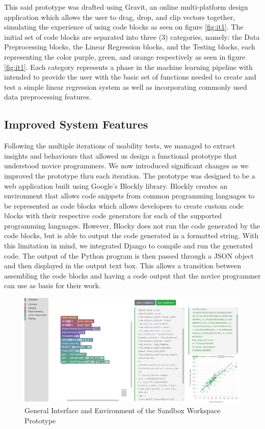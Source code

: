 \documentclass{sigchi}
\begin{document}
This said prototype was drafted using Gravit, an online multi-platform design application which allows the user to drag, drop, and clip vectors together, simulating the experience of using code blocks as seen on figure \ref{fig:it1}. The initial set of code blocks are separated into three (3) categories, namely: the Data Preprocessing blocks, the Linear Regression blocks, and the Testing blocks, each representing the color purple, green, and orange respectively as seen in figure \ref{fig:it1}. Each category represents a phase in the machine learning pipeline with intended to provide the user with the basic set of functions needed to create and test a simple linear regression system as well as incorporating commonly used data preprocessing features.

\subsection{Improved System Features}
Following the multiple iterations of usability tests, we managed to extract insights and behaviours that allowed us design a functional prototype that understood novice programmers. 
We now introduced significant changes as we improved the prototype thru each iteration. The prototype was designed to be a web application built using Google's Blockly library. Blockly creates an environment that allows code snippets from common programming languages to be represented as code blocks which allows developers to create custom code blocks with their respective code generators for each of the supported programming languages. However, Blocky does not run the code generated by the code blocks, but is able to output the code generated in a formatted string. With this limitation in mind, we integrated Django to compile and run the generated code. The output of the Python program is then passed through a JSON object and then displayed in the output text box. This allows a transition between assembling the code blocks and having a code output that the novice programmer can use as basis for their work. 

\begin{figure}[t]
    \centering
    \includegraphics[width = 2 \columnwidth]{figures/Gen_Interface}
    \caption{General Interface and Environment of the Sandbox Workspace Prototype}
    \label{fig:gen_interface}
\end{figure}
\end{document}
